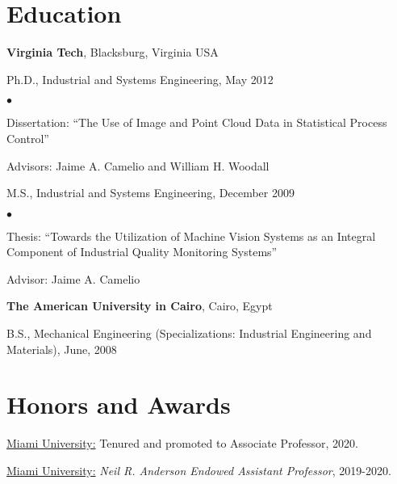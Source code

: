 \documentclass[margin,line]{res}
\newenvironment{list1}{
  \begin{list}{\ding{113}}{%
      \setlength{\itemsep}{0in}
      \setlength{\parsep}{0in} \setlength{\parskip}{0in}
      \setlength{\topsep}{0in} \setlength{\partopsep}{0in} 
      \setlength{\leftmargin}{0.17in}}}{\end{list}}
\newenvironment{list2}{
  \begin{list}{$\bullet$}{%
      \setlength{\itemsep}{0in}
      \setlength{\parsep}{0in} \setlength{\parskip}{0in}
      \setlength{\topsep}{0in} \setlength{\partopsep}{0in} 
      \setlength{\leftmargin}{0.2in}}}{\end{list}}
\begin{document}
\begin{resume}
\section{\sc Education}
{\bf Virginia Tech}, Blacksburg, Virginia USA\\
\vspace*{-.1in}
\begin{list1}
\item[] Ph.D., Industrial and Systems Engineering, May 2012
\begin{list2}
\vspace*{.05in}
\item Dissertation:  ``The Use of Image and Point Cloud Data in Statistical Process Control'' 
\item Advisors:  Jaime A. Camelio and William H. Woodall
\end{list2}
\vspace*{.05in}
\item[] M.S., Industrial and Systems Engineering,  December 2009
\begin{list2}
\item Thesis:  ``Towards the Utilization of Machine Vision Systems as an Integral Component of \hspace*{0.55 in} Industrial Quality Monitoring Systems'' 
\item Advisor:  Jaime A. Camelio
\end{list2}
\end{list1}

{\bf The American University in Cairo}, Cairo, Egypt\\
\vspace*{-.1in}
\begin{list1}
\item[] B.S., Mechanical Engineering (Specializations: Industrial Engineering and Materials),  June, 2008
\end{list1}


\section{\sc Honors and Awards} 

\underline{Miami University:} Tenured and promoted to Associate Professor, 2020.

\vspace*{-2.5mm}
\underline{Miami University:} \textit{Neil R. Anderson Endowed Assistant Professor}, 2019-2020. 


\end{resume}
\end{document}
